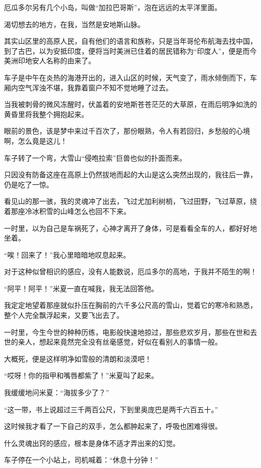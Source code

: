 \par 厄瓜多尔另有几个小岛，叫做“加拉巴哥斯”，泡在远远的太平洋里面。
\par 渴切想去的地方，在我，当然是安地斯山脉。
\par 其实山区里的高原人民，自有他们的语言和族称，只是当年哥伦布航海去找中国，到了古巴，以为安抵印度，便将当时美洲已住着的居民错称为“印度人”，便是而今美洲印地安人名称的由来了。
\par 车子是中午在炎热的海港开出的，进入山区的时候，天气变了，雨水倾倒而下，车厢内空气浑浊不堪，我靠着窗户不知不觉地睡了过去。
\par 当我被刺骨的微风冻醒时，伏盖着的安地斯苍苍茫茫的大草原，在雨后明净如洗的黄昏里将我整个拥抱起来。
\par 眼前的景色，该是梦中来过千百次了，那份眼熟，令人有若回归，乡愁般的心境啊，怎么竟是这儿！
\par 车子转了一个弯，大雪山“侵咆拉索”巨兽也似的扑面而来。
\par 只因没有防备这座在高原上仍然拔地而起的大山是这么突然出现的，我往后一靠，仍是吃了一惊。
\par 看见山的那一骇，我的灵魂冲了出去，飞过尤加利树梢，飞过田野，飞过草原，绕着那座冷冰积雪的山峰怎么也回不下来。
\par 一时里，以为自己是车祸死了，心神才离开了身体，可是看看全车的人，都好好地坐着。
\par “唉！回来了！”我心里暗暗地叹息起来。
\par 对于这种似曾相识的感应，没有人能数说，厄瓜多尔的高地，于我并不陌生的啊！
\par “阿平！阿平！”米夏一直在喊我，我无法回答他。
\par 我定定地望着那座就似扑压在胸前的六千多公尺高的雪山，觉着它的寒冷和熟悉，整个人完全飘浮起来，又要飞出去了。
\par 一时里，今生今世的种种历练，电影般快速地掠过，那些悲欢岁月，那些在世和去世的亲人，想起来竟然完全没有丝毫感觉，好似在看别人的事情一般。
\par 大概死，便是这样明净如雪般的清朗和淡漠吧！
\par “哎呀！你的指甲和嘴唇都紫了！”米夏叫了起来。
\par 我缓缓地问米夏：“海拔多少了？”
\par “这一带，书上说超过三千两百公尺，下到里奥庞巴是两千六百五十。”
\par 这时候我才看了一下自己的双手，怎么都肿起来了，呼吸也困难得很。
\par 什么灵魂出窍的感应，根本是身体不适才弄出来的幻觉。
\par 车子停在一个小站上，司机喊着：“休息十分钟！”
